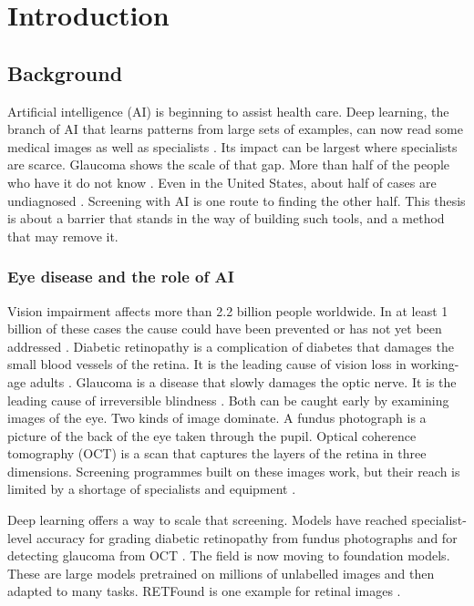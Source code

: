 \chapter{Introduction}
\label{ch:intro}

\section{Background}
\label{sec:background}

Artificial intelligence (AI) is beginning to assist health care. Deep learning, the branch of AI that learns patterns from large sets of examples, can now read some medical images as well as specialists \citep{gulshan2016dr, ting2017dr}. Its impact can be largest where specialists are scarce. Glaucoma shows the scale of that gap. More than half of the people who have it do not know \citep{soh2021undetected}. Even in the United States, about half of cases are undiagnosed \citep{tielsch1991baltimore}. Screening with AI is one route to finding the other half. This thesis is about a barrier that stands in the way of building such tools, and a method that may remove it.

\subsection{Eye disease and the role of AI}
\label{sec:intro-eye}

Vision impairment affects more than 2.2 billion people worldwide. In at least 1 billion of these cases the cause could have been prevented or has not yet been addressed \citep{who2023blindness}. Diabetic retinopathy is a complication of diabetes that damages the small blood vessels of the retina. It is the leading cause of vision loss in working-age adults \citep{bourne2021trends}. Glaucoma is a disease that slowly damages the optic nerve. It is the leading cause of irreversible blindness \citep{tham2014glaucoma}. Both can be caught early by examining images of the eye. Two kinds of image dominate. A fundus photograph is a picture of the back of the eye taken through the pupil. Optical coherence tomography (OCT) is a scan that captures the layers of the retina in three dimensions. Screening programmes built on these images work, but their reach is limited by a shortage of specialists and equipment \citep{who2024nhwa}.

Deep learning offers a way to scale that screening. Models have reached specialist-level accuracy for grading diabetic retinopathy from fundus photographs \citep{gulshan2016dr, ting2017dr} and for detecting glaucoma from OCT \citep{thompson2022oct}. The field is now moving to foundation models. These are large models pretrained on millions of unlabelled images and then adapted to many tasks. RETFound is one example for retinal images \citep{zhou2023retfound}.

